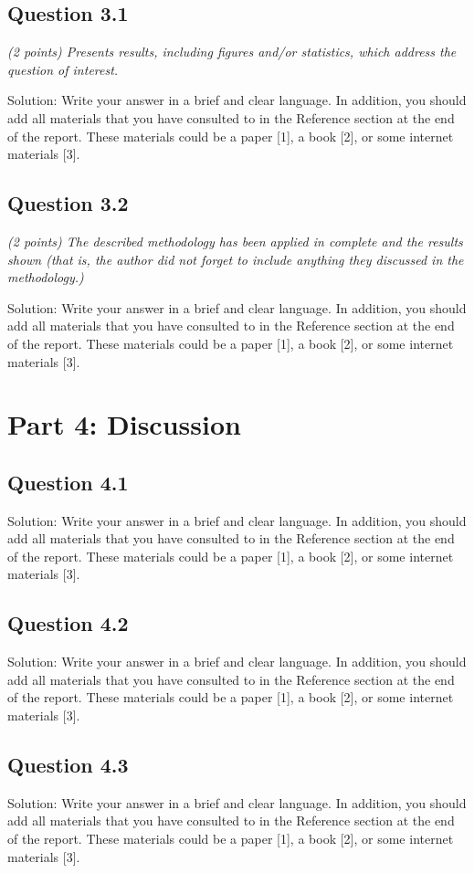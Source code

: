 \documentclass[12pt]{article}
\begin{document}
\subsection{Question 3.1}
\textit{(2 points) Presents results, including figures and/or statistics, which address the question of interest.}

Solution: Write your answer in a brief and clear language. In addition, you should add all materials that you have consulted to in the Reference section at the end of the report. These materials could be a paper [1], a book [2], or some internet materials [3].

\subsection{Question 3.2}
\textit{(2 points) The described methodology has been applied in complete and the results shown (that is, the author did not forget to include anything they discussed in the methodology.) }

Solution: Write your answer in a brief and clear language. In addition, you should add all materials that you have consulted to in the Reference section at the end of the report. These materials could be a paper [1], a book [2], or some internet materials [3].

\section{Part 4: Discussion}
\subsection{Question 4.1}
Solution: Write your answer in a brief and clear language. In addition, you should add all materials that you have consulted to in the Reference section at the end of the report. These materials could be a paper [1], a book [2], or some internet materials [3].

\subsection{Question 4.2}
Solution: Write your answer in a brief and clear language. In addition, you should add all materials that you have consulted to in the Reference section at the end of the report. These materials could be a paper [1], a book [2], or some internet materials [3].

\subsection{Question 4.3}
Solution: Write your answer in a brief and clear language. In addition, you should add all materials that you have consulted to in the Reference section at the end of the report. These materials could be a paper [1], a book [2], or some internet materials [3].
\end{document}

